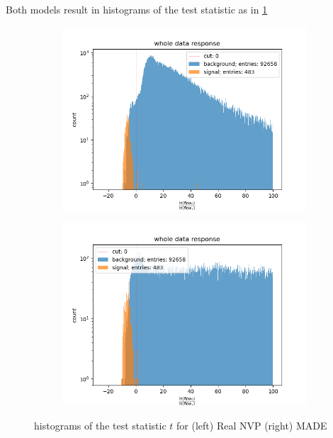 \documentclass[%
 reprint,
 amsmath,amssymb,
 aps,
]{revtex4-2}
\begin{document}
Both models result in histograms of the test statistic as in \ref{fig:histt}
 \begin{figure}[ht]
	\centering
	\begin{subfigure}[h]{0.475\textwidth}
		\centering
		\includegraphics[width=\textwidth]{figs/fracln_data_hist_Real_NVP.png}
	\end{subfigure}
	\hfill
	\begin{subfigure}[h]{0.475\textwidth}  
		\centering 
		\includegraphics[width=\textwidth]{figs/fracln_data_hist_MADE.png}
	\end{subfigure}
	\caption[ histograms of the test statistic $t$ for (left) Real NVP (right) MADE ]
	{\small histograms of the test statistic $t$ for (left) Real NVP (right) MADE} 
	\label{fig:histt}
\end{figure}
\end{document}
